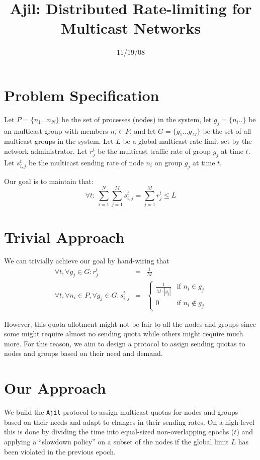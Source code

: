 \documentclass[lettersize,12pt]{article}
\title{Ajil: Distributed Rate-limiting for Multicast Networks}
\date{11/19/08}
\begin{document}
\maketitle

\section{Problem Specification}
Let $P = \{n_1 ... n_N\}$ be the set of processes (nodes) in the system, let $g_j = \{n_i ..\}$ be an multicast group with members $n_i \in P$, and let $G = \{g_1 ... g_M\}$ be the set of all multicast groups in the system. Let $L$ be a global multicast rate limit set by the network administrator. Let $r_j^t$ be the multicast traffic rate of group $g_j$ at time $t$. Let $s_{i, j}^t$ be the multicast sending rate of node $n_i$ on group $g_j$ at time $t$.

Our goal is to maintain that:
\[ \forall t:\ \sum_{i = 1}^{N} \sum_{j = 1}^{M} s_{i, j}^t = \sum_{j = 1}^{M} r_j^t \leq L\]

\section{Trivial Approach}
We can trivially achieve our goal by hand-wiring that
\begin{eqnarray*}
\forall t, \forall g_j \in G: r_j^t &=& \frac{1}{M} \\
\forall t, \forall n_i \in P, \forall g_j \in G: s_{i, j}^t &=&
\begin{cases}
 \frac{1}{M \cdot |g_j|} & \text{if $n_i \in g_j$} \\
 0 & \text{if $n_i \not \in g_j$}
\end{cases}
\end{eqnarray*}

However, this quota allotment might not be fair to all the nodes and groups since some might require almost no sending quota while others might require much more. For this reason, we aim to design a protocol to assign sending quotas to nodes and groups based on their need and demand.

\section{Our Approach}
We build the \verb|Ajil| protocol to assign multicast quotas for nodes and groups based on their needs and adapt to changes in their sending rates. On a high level this is done by dividing the time into equal-sized non-overlapping epochs ($t$) and applying a ``slowdown policy'' on a subset of the nodes if the global limit $L$ has been violated in the previous epoch.
\end{document}
